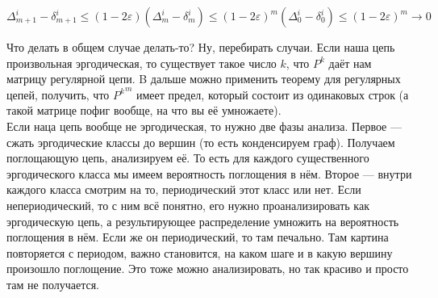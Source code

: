 \documentclass{article}
\begin{document}
\begin{itemize}
\begin{Proof}
            $$
            \Delta_{m+1}^i-\delta_{m+1}^i\leqslant(1-2\varepsilon)(\Delta_m^i-\delta_m^i)\leqslant(1-2\varepsilon)^m(\Delta_0^i-\delta_0^i)\leqslant(1-2\varepsilon)^m\to0
            $$
        \end{Proof}
        \begin{Comment}
            Что делать в общем случае делать-то? Ну, перебирать случаи. Если наша цепь произвольная эргодическая, то существует такое число $k$, что $P^k$ даёт нам матрицу регулярной цепи. B дальше можно применить теорему для регулярных цепей, получить, что ${P^k}^m$ имеет предел, который состоит из одинаковых строк (а такой матрице пофиг вообще, на что вы её умножаете).\\
            Если наца цепь вообще не эргодическая, то нужно две фазы анализа. Первое --- сжать эргодические классы до вершин (то есть конденсируем граф). Получаем поглощающую цепь, анализируем её. То есть для каждого существенного эргодического класса мы имеем вероятность поглощения в нём. Второе --- внутри каждого класса смотрим на то, периодический этот класс или нет. Если непериодический, то с ним всё понятно, его нужно проанализировать как эргодическую цепь, а результирующее распределение умножить на вероятность поглощения в нём. Если же он периодический, то там печально. Там картина повторяется с периодом, важно становится, на каком шаге и в какую вершину произошло поглощение. Это тоже можно анализировать, но так красиво и просто там не получается.
        \end{Comment}
    \end{itemize}
\end{document}
